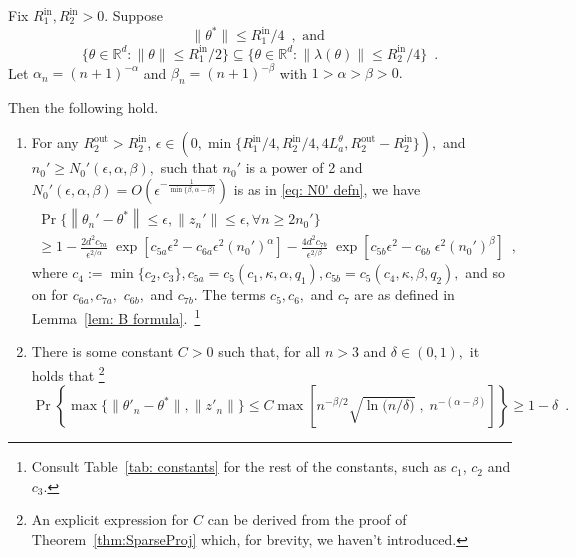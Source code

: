 \documentclass[usenames,dvipsnames,final,12pt]{colt2018} %
\newcommand{\dReal}{\mathbb{R}^d}
\newcommand{\st}{\alpha}
\newcommand{\Rti}{R_1^{\textrm{in}}}
\newcommand{\thS}{\theta^*}
\newcommand{\Lt}[1]{L^{\theta}_{#1}}
\newcommand{\sw}{\beta}
\newcommand{\Rzo}{R_2^{\textrm{out}}}
\newcommand{\Rzi}{R_2^{\textrm{in}}}
\newcommand{\norm}[1]{\left\lVert#1\right\rVert}
\newcommand{\gugan}[1]{#1}
\begin{document}
\begin{theorem}
%
\label{thm:SparseProj}
\gugan{
Fix $\Rti, \Rzi >0.$ Suppose
\begin{equation}
\label{eq: theta assumption}
\|\theta^*\| \leq \Rti/4 \enspace, \mbox{ and }
\end{equation}
%
\begin{equation}
\label{eq: w assumption}
\{\theta \in \dReal: \|\theta\| \leq \Rti/2\}
\subseteq \{\theta \in \dReal : \|\lambda(\theta)\|\leq \Rzi/4\} \enspace.
\end{equation}
%
Let $\alpha_n=(n+1)^{-\alpha}$ and $\beta_n=(n+1)^{-\beta}$ with $1>\alpha>\beta>0.$
}
%
\gugan{Then the following hold.}
\gugan{
\begin{enumerate}
\item \label{st:ProbEst}For any {$\Rzo>\Rzi$,} $\epsilon \in (0,\min\{\Rti/4, \Rzi/4, 4 \Lt{a} {, \Rzo-\Rzi} \}),$ and $n_0' \geq N_0'(\epsilon,\st,\sw),$ such that $n_0'$ is a power of 2 and
$N_0'(\epsilon,\alpha,\beta) = O\left(\epsilon^{-\frac{1}{\min\{\beta,\alpha-\beta\}}}\right)$
is as in \eqref{eq: N0' defn}, we have
%
\begin{multline}
\Pr\{\norm{\theta_n' - \thS} \leq \epsilon, \norm{z_n'} \leq \epsilon, \forall n \geq 2n_0'\} \\
\geq
1
-
 \frac{2 d^2 c_{7a}}{\epsilon^{2/\alpha}} \; \exp\left[c_{5a} \epsilon^2 - c_{6a} \epsilon^2 (n_0')^\alpha \right] - \frac{4d^2 c_{7b}}{\epsilon^{2/\beta}} \; \exp\left[c_{5b} \epsilon^2 - c_{6b} \; \epsilon^2 (n_0')^\beta \right] \enspace,
\label{eq: bound on projected iterates}
\end{multline}
where $c_4 := \min\{c_2, c_3\}, c_{5a} = c_5(c_1, \kappa, \alpha, q_1), c_{5b} = c_5(c_4, \kappa, \beta, q_2),$ and so on for $c_{6a}, c_{7a},$ $c_{6b},$ and $c_{7b}.$ \gugan{The terms  $c_5, c_6,$ and $c_7$ are as defined in Lemma~\ref{lem: B formula}.}~\footnote{{Consult Table~\ref{tab: constants} for the rest of the constants, such as $c_1$, $c_2$ and $c_3$.}}
%
\item \label{st:ConvRate} There is some constant $C>0$ such that, for all $n > 3$ and $\delta \in (0,1),$ it holds that \footnote{An explicit expression for $C$ can be derived from the proof of Theorem~\ref{thm:SparseProj} which, for brevity, we haven't introduced. }
%
\begin{equation}
\label{eqn:FiniteTimeRate}
\Pr\left\{\max\{\|\theta'_n - \theta^*\|, \|z'_n\|\} \leq C\max\left[{n^{-{\beta}/{2}}} {\sqrt{\ln ({n}/{\delta)}}}\;,\; {n^{-(\st-\sw)}}\right]\right\}
\geq 1 - \delta \enspace.
\end{equation}
%
\end{enumerate}
}
%
\end{theorem}
\end{document}
